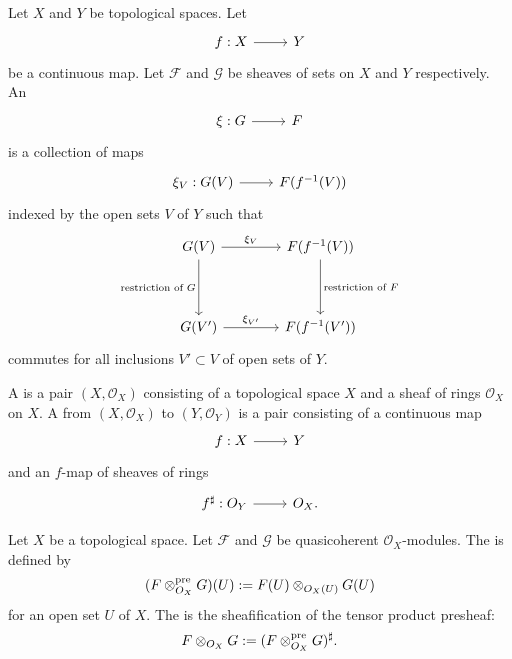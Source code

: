 \documentclass [11 pt, oneside] {article}
\begin{document}
\begin{definition}\label{}\text{}
Let $X$ and $Y$ be topological spaces.
Let
\[
\begin{tikzcd}
	f:X\ar[r]& Y
\end{tikzcd}
\]
be a continuous map.
Let $\mathscr{F}$ and $\mathscr{G}$ be sheaves of sets on $X$ and $Y$ respectively. 
An  
\[
\begin{tikzcd}
	\xi : \mathscr{G}\ar[r] & \mathscr{F}
\end{tikzcd}
\]
is a collection of maps
\[
\begin{tikzcd}
	\xi_{V} : \mathscr{G}(V)\ar[r]  &\mathscr{F}(f^{-1}(V))
\end{tikzcd}
\]
indexed by the open sets $V$ of $Y$ such that
\[
\begin{tikzcd}[sep = 4 em]
	\mathscr{G}(V)\ar[r,"\xi_{V}" ] \ar[d,"\textrm{restriction of $\mathscr{G}$}", swap] & \mathscr{F}(f^{-1}(V)) \ar[d,"\textrm{restriction of $\mathscr{F}$}"]\\
	\mathscr{G}(V')\ar[r,"\xi_{V'}" ] & \mathscr{F}(f^{-1}(V'))
\end{tikzcd}
\]
commutes for all inclusions $V'\subset V$ of open sets of $Y$.

\end{definition}


\begin{definition}\label{}\text{}
A  is a pair $(X,\mathscr{O}_{X})$ consisting of a topological space $X$ and a sheaf of rings $\mathscr{O}_{X}$ on $X$. A  from $(X,\mathscr{O}_{X})$ to $(Y,\mathscr{O}_{Y})$ is a pair consisting of a continuous map
\[
\begin{tikzcd}
	f:X\ar[r] &Y
\end{tikzcd}
\]
and an $f$-map of sheaves of rings
\[
\begin{tikzcd}
	f^{\sharp} : \mathscr{O}_{Y}\ar[r] & \mathscr{O}_{X}.
\end{tikzcd}
\]

\end{definition}


\begin{definition}[ ]\label{}\text{}
Let $X$ be a topological space. 
Let $\mathscr{F}$ and $\mathscr{G}$ be quasicoherent $\mathscr{O}_X$-modules. The  is defined by
\begin{align*}
	(\relax{F}\otimes^{\textrm{pre}}_{\relax{O}_X} \relax{G})(U) :=  \relax{F}(U) \otimes_{\relax{O}_X(U)}  \relax{G}(U)
\end{align*}
for an open set $U$ of $X$. The  is the sheafification of the tensor product presheaf:
\begin{align*}
	\relax{F}\otimes_{\relax{O}_X} \relax{G} := (\relax{F}\otimes^{\textrm{pre}}_{\relax{O}_X}\relax{G})^\sharp.
\end{align*}
\end{definition}
\end{document}
